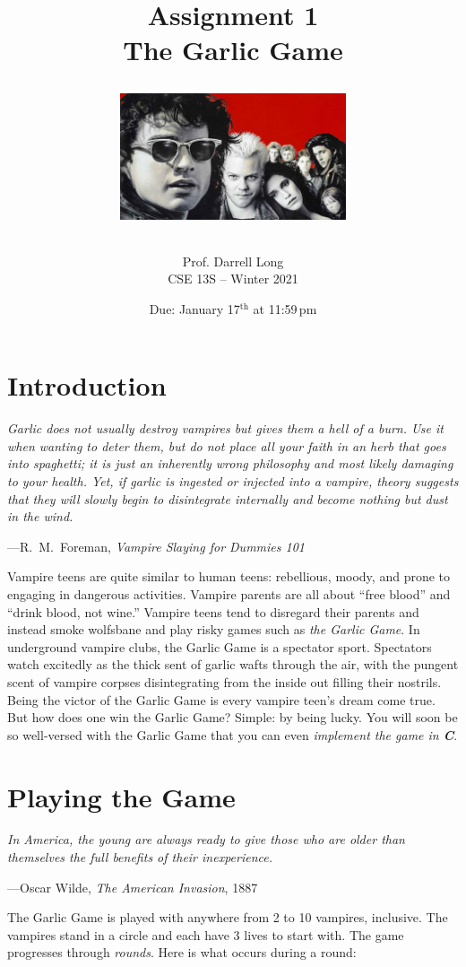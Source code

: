 \documentclass[11pt]{article}
\title{Assignment 1 \\ The Garlic Game \\ \bigskip
\centerline{\includegraphics[width=0.5\textwidth]{images/the-lost-boys-original.jpg}}}
\author{Prof. Darrell Long \\ CSE 13S -- Winter 2021}
\date{Due: January 17$^\text{th}$ at 11:59\,pm}
\begin{document}
\maketitle

\section{Introduction}

\epigraph{\emph{Garlic does not usually destroy vampires but gives them a hell
of a burn. Use it when wanting to deter them, but do not place all your faith in
an herb that goes into spaghetti; it is just an inherently wrong philosophy and
most likely damaging to your health. Yet, if garlic is ingested or injected into
a vampire, theory suggests that they will slowly begin to disintegrate
internally and become nothing but dust in the wind.}}{---R.\ M.\ Foreman,
\emph{Vampire Slaying for Dummies 101}}

Vampire teens are quite similar to human teens: rebellious, moody, and prone to
engaging in dangerous activities. Vampire parents are all about ``free blood''
and ``drink blood, not wine.'' Vampire teens tend to disregard their parents and
instead smoke wolfsbane and play risky games such as \emph{the Garlic Game}. In
underground vampire clubs, the Garlic Game is a spectator sport. Spectators watch
excitedly as the thick sent of garlic wafts through the air, with the pungent
scent of vampire corpses disintegrating from the inside out filling their
nostrils. Being the victor of the Garlic Game is every vampire teen's dream come
true. But how does one win the Garlic Game? Simple: by being lucky. You will
soon be so well-versed with the Garlic Game that you can even \emph{implement
the game in \textbf{C}}.


\section{Playing the Game}

\textwidth
\epigraph{\emph{In America, the young are always ready to give those who are
older than themselves the full benefits of their inexperience.}}{---Oscar Wilde,
\emph{The American Invasion}, 1887}

The Garlic Game is played with anywhere from 2 to 10 vampires, inclusive. The
vampires stand in a circle and each have 3 lives to start with. The game
progresses through \emph{rounds}. Here is what occurs during a round:
\end{document}
